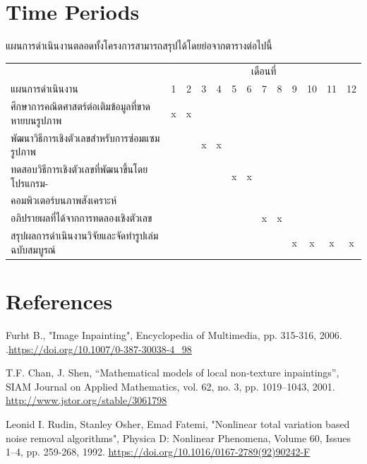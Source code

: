 \documentclass[hidelinks,a4paper,14pt]{article}
\numberwithin{equation}{section}							%
\begin{document}
{\section{Time Periods}
แผนการดำเนินงานตลอดทั้งโครงการสามารถสรุปได้โดยย่อจากตารางต่อไปนี้
\begin{center}
	\begin{tabular}[ht]{|l|c|c|c|c|c|c|c|c|c|c|c|c|}
		\hline
		&\multicolumn{12}{c|}{เดือนที่}\\
		\cline{2-13}
		แผนการดำเนินงาน&1&2&3&4&5&6&7&8&9&10&11&12\\
		\hline
		ศึกษาการคณิตศาสตร์ต่อเติมข้อมูลที่ขาดหายบนรูปภาพ&x&x& & & & & & & & & &\\
		พัฒนาวิธีการเชิงตัวเลขสำหรับการซ่อมแซมรูปภาพ& & &x&x& & & & & & & &\\
		ทดสอบวิธีการเชิงตัวเลขที่พัฒนาขึ้นโดยโปรแกรม- & & & & &x&x& & & & & &\\
		คอมพิวเตอร์บนภาพสังเคราะห์ & & & & & & & & & & & &\\
		อภิปรายผลที่ได้จากการทดลองเชิงตัวเลข & & & & & & &x&x& & & &\\
		สรุปผลการดำเนินงานวิจัยและจัดทำรูปเล่มฉบับสมบูรณ์& & & & & & & & &x&x&x&x\\
		\hline
	\end{tabular}
\end{center}




\section{References}

\renewcommand{\section}[2]{} %
\begin{thebibliography}{}
	Furht B., "Image Inpainting", Encyclopedia of Multimedia, pp. 315-316, 2006. .\url{https://doi.org/10.1007/0-387-30038-4_98}
	
	T.F. Chan, J. Shen, “Mathematical models of local non-texture inpaintings”, SIAM Journal on Applied Mathematics, vol. 62, no. 3, pp. 1019–1043, 2001. \url{http://www.jstor.org/stable/3061798}
	
	Leonid I. Rudin, Stanley Osher, Emad Fatemi, "Nonlinear total variation based noise removal algorithms", Physica D: Nonlinear Phenomena, Volume 60, Issues 1–4, pp. 259-268, 1992. \url{https://doi.org/10.1016/0167-2789(92)90242-F}
	

\end{thebibliography}}
\end{document}
